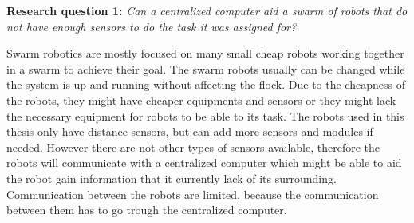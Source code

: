 %
%
%



\textbf{Research question 1:} {\it Can a centralized computer aid a swarm of robots that do not have enough sensors to do the task it was assigned for?}

Swarm robotics are mostly focused on many small cheap robots working together in a swarm to achieve their goal. The swarm robots usually can be changed while the system is up and running without affecting the flock.
Due to the cheapness of the robots, they might have cheaper equipments and sensors or they might lack the necessary equipment for robots to be able to its task. 
The robots used in this thesis only have distance sensors, but can add more sensors and modules if needed. However there are not other types of sensors available, therefore the robots will communicate with a centralized computer which might be able to aid the robot gain information that it currently lack of its surrounding.
Communication between the robots are limited, because the communication between them has to go trough the centralized computer.


